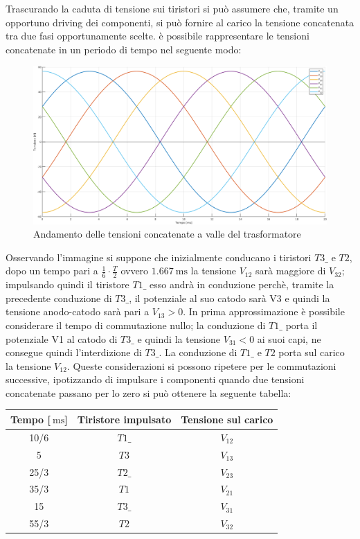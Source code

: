 \documentclass[a4paper,10pt]{article}
\begin{document}
Trascurando la caduta di tensione sui tiristori si può assumere che, tramite un
opportuno driving dei componenti, si può fornire al carico la tensione
concatenata tra due fasi opportunamente scelte.
è possibile rappresentare le tensioni concatenate in un periodo di tempo nel seguente modo:
 \begin{figure}[H]
 \centering
 \includegraphics[keepaspectratio=true,width=0.95\linewidth]
 {img/concatenate_carico.png}
 \caption{Andamento delle tensioni concatenate a valle del trasformatore}
 \label{fig:concatenate}
\end{figure}

Osservando l'immagine si suppone che inizialmente conducano i tiristori \(T3\_\) e \(T2\),
dopo un tempo pari a \(\frac{1}{6}\cdot \frac{T}{2}\) ovvero 
$\SI{1.667}{\milli\second}$ la tensione \(V_{12}\) sarà maggiore 
di \(V_{32}\); impulsando quindi il tiristore \(T1\_\) esso andrà in conduzione perchè, tramite la precedente conduzione di \(T3\_\), il potenziale al suo catodo sarà V3 e quindi la tensione anodo-catodo sarà pari a \(V_{13} > 0 \).
In prima approssimazione è possibile considerare il tempo di commutazione nullo;
la conduzione di \(T1\_\) porta il potenziale V1 al catodo di \(T3\_\) e 
quindi la tensione \(V_{31} < 0\) ai suoi capi, ne consegue quindi
l'interdizione di \(T3\_\).
La conduzione di \(T1\_\) e \(T2\) porta sul carico la tensione \(V_{12}\).
\medbreak
Queste considerazioni si possono ripetere per le commutazioni successive, ipotizzando
di impulsare i componenti quando due tensioni concatenate passano per lo zero si può 
ottenere la seguente tabella:

\begin{center}
\begin{tabular}{c|c|c}
  Tempo [$\SI{}{\milli\second}$]&Tiristore impulsato&Tensione sul carico\\ \hline
  10/6 & \(T1\_\)  &  \(V_{12}\) \\
  5 & \(T3\) & \(V_{13}\) \\
  25/3 & \(T2\_\) &\(V_{23}\) \\
  35/3 & \(T1\)& \(V_{21}\)  \\
  15 & \(T3\_\)&\(V_{31}\) \\
  55/3 & \(T2\) & \(V_{32}\)
\end{tabular}
\end{center}
\end{document}
